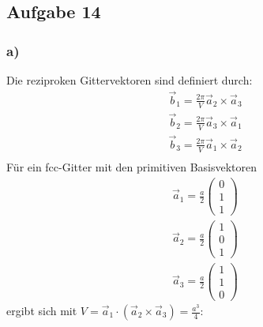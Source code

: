 \subsection*{Aufgabe 14}
\subsubsection*{a)}
Die reziproken Gittervektoren sind definiert durch:
\begin{align*}
\vec{b}_1 = \frac{2\pi}{V} \vec{a}_2\times\vec{a}_3\\
\vec{b}_2 = \frac{2\pi}{V} \vec{a}_3\times\vec{a}_1\\
\vec{b}_3 = \frac{2\pi}{V} \vec{a}_1\times\vec{a}_2\\
\end{align*}
Für ein fcc-Gitter mit den primitiven Basisvektoren
\begin{align*}
\vec{a}_1=\frac{a}{2}\begin{pmatrix}0\\1\\1\end{pmatrix}\\
\vec{a}_2=\frac{a}{2}\begin{pmatrix}1\\0\\1\end{pmatrix}\\
\vec{a}_3=\frac{a}{2}\begin{pmatrix}1\\1\\0\end{pmatrix}
\end{align*}
ergibt sich mit $V = \vec{a}_1 \cdot (\vec{a}_2 \times \vec{a}_3) = \frac{a^3}{4}$:
